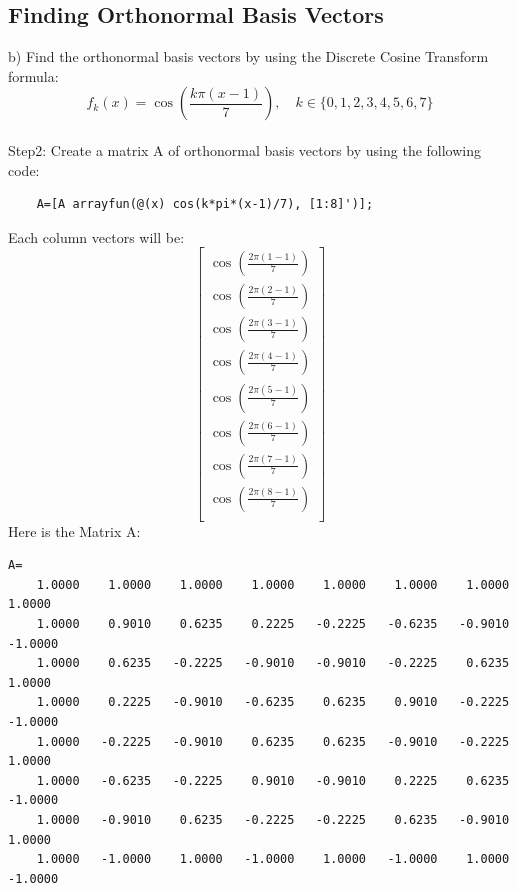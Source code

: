 \documentclass{article}
\begin{document}
\subsection{Finding Orthonormal Basis Vectors}
b) Find the orthonormal basis vectors by using the Discrete Cosine Transform formula:\\
\begin{equation}
    f_k(x) = \cos\left(\frac{k\pi(x - 1)}{7}\right), \quad k \in \{0, 1, 2, 3, 4, 5, 6, 7\}
\end{equation}\\
Step2: Create a matrix A of orthonormal basis vectors by using the following code:\\
\begin{verbatim}
    A=[A arrayfun(@(x) cos(k*pi*(x-1)/7), [1:8]')];
\end{verbatim}
Each column vectors will be:\\
\begin{equation}
    \begin{bmatrix}
        \cos\left(\frac{2\pi(1-1)}{7}\right) \\
        \cos\left(\frac{2\pi(2-1)}{7}\right) \\
        \cos\left(\frac{2\pi(3-1)}{7}\right) \\
        \cos\left(\frac{2\pi(4-1)}{7}\right) \\
        \cos\left(\frac{2\pi(5-1)}{7}\right) \\
        \cos\left(\frac{2\pi(6-1)}{7}\right) \\
        \cos\left(\frac{2\pi(7-1)}{7}\right) \\
        \cos\left(\frac{2\pi(8-1)}{7}\right) \\
    \end{bmatrix}
\end{equation}
Here is the Matrix A:\\
\begin{verbatim}
A=
    1.0000    1.0000    1.0000    1.0000    1.0000    1.0000    1.0000    1.0000
    1.0000    0.9010    0.6235    0.2225   -0.2225   -0.6235   -0.9010   -1.0000
    1.0000    0.6235   -0.2225   -0.9010   -0.9010   -0.2225    0.6235    1.0000
    1.0000    0.2225   -0.9010   -0.6235    0.6235    0.9010   -0.2225   -1.0000
    1.0000   -0.2225   -0.9010    0.6235    0.6235   -0.9010   -0.2225    1.0000
    1.0000   -0.6235   -0.2225    0.9010   -0.9010    0.2225    0.6235   -1.0000
    1.0000   -0.9010    0.6235   -0.2225   -0.2225    0.6235   -0.9010    1.0000
    1.0000   -1.0000    1.0000   -1.0000    1.0000   -1.0000    1.0000   -1.0000
\end{verbatim}
\end{document}
